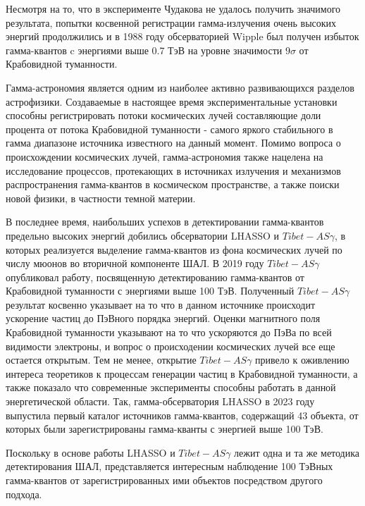 Несмотря на то, что в эксперименте Чудакова не удалось получить значимого результата, попытки косвенной регистрации гамма-излучения очень высоких энергий продолжились и в 1988 году обсерваторией Wipple был получен избыток гамма-квантов c энергиями выше 0.7 ТэВ на уровне значимости $9\sigma$ от Крабовидной туманности\cite{Crab_Wipple}. 

Гамма-астрономия является одним из наиболее активно развивающихся разделов астрофизики. Создаваемые в настоящее время экспериментальные установки способны регистрировать потоки космических лучей составляющие доли процента от потока Крабовидной туманности - самого яркого стабильного в гамма диапазоне источника известного на данный момент. Помимо вопроса о происхождении космических лучей, гамма-астрономия также нацелена на исследование процессов, протекающих в источниках излучения и механизмов распространения гамма-квантов в космическом пространстве, а также поиски новой физики, в частности темной материи.

В последнее время, наибольших успехов в детектировании гамма-квантов предельно высоких энергий добились обсерватории LHASSO и $Tibet-AS\gamma$, в которых реализуется выделение гамма-квантов из фона космических лучей по числу мюонов во вторичной компоненте ШАЛ. В 2019 году $Tibet-AS\gamma$ опубликовал работу, посвященную детектированию гамма-квантов от Крабовидной туманности с энергиями выше 100 ТэВ\cite{Tibet2019}.  Полученный $Tibet-AS\gamma$ результат косвенно указывает на то что в данном источнике происходит ускорение частиц до ПэВного порядка энергий. Оценки магнитного поля Крабовидной туманности указывают на то что ускоряются до ПэВа по всей видимости электроны, и вопрос о происходении космических лучей все еще остается открытым. Тем не менее, открытие $Tibet-AS\gamma$ привело к оживлению интереса теоретиков к процессам генерации частиц в Крабовидной туманности, а также показало что современные эксперименты способны работать в данной энергетической области. Так, гамма-обсерватория LHASSO в 2023 году выпустила первый каталог источников гамма-квантов, содержащий 43 объекта, от которых были зарегистрированы гамма-кванты с энергией выше 100 ТэВ\cite{Lhaaso_cat2023}.

Поскольку в основе работы LHASSO и $Tibet-AS\gamma$ лежит одна и та же методика детектирования ШАЛ, представляется интересным наблюдение 100 ТэВных гамма-квантов от зарегистрированных ими объектов посредством другого подхода.

